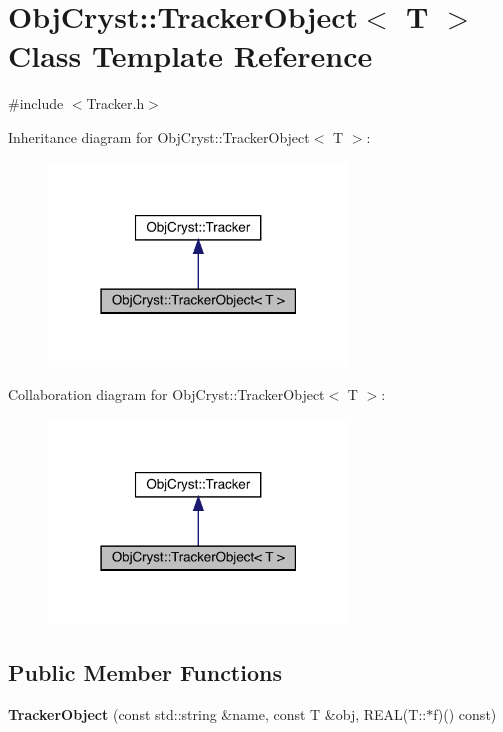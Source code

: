 \hypertarget{class_obj_cryst_1_1_tracker_object}{}\section{Obj\+Cryst\+::Tracker\+Object$<$ T $>$ Class Template Reference}
\label{class_obj_cryst_1_1_tracker_object}


{\ttfamily \#include $<$Tracker.\+h$>$}



Inheritance diagram for Obj\+Cryst\+::Tracker\+Object$<$ T $>$\+:
\nopagebreak
\begin{figure}[H]
\begin{center}
\leavevmode
\includegraphics[width=226pt]{class_obj_cryst_1_1_tracker_object__inherit__graph}
\end{center}
\end{figure}


Collaboration diagram for Obj\+Cryst\+::Tracker\+Object$<$ T $>$\+:
\nopagebreak
\begin{figure}[H]
\begin{center}
\leavevmode
\includegraphics[width=226pt]{class_obj_cryst_1_1_tracker_object__coll__graph}
\end{center}
\end{figure}
\subsection*{Public Member Functions}
\begin{DoxyCompactItemize}
\item 
\mbox{\label{class_obj_cryst_1_1_tracker_object_a2309c151aec16dfac6d851f5dd531504}} 
{\bfseries Tracker\+Object} (const std\+::string \&name, const T \&obj, R\+E\+AL(T\+::$\ast$f)() const)
\end{DoxyCompactItemize}
